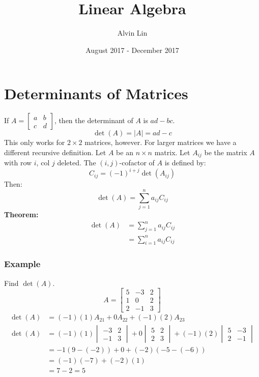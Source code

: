 \documentclass{math}
\title{Linear Algebra}
\author{Alvin Lin}
\date{August 2017 - December 2017}
\begin{document}
\maketitle

\section*{Determinants of Matrices}
If \( A = \begin{bmatrix}a & b \\ c & d\end{bmatrix} \), then the determinant
of \( A \) is \( ad-bc \).
\[ \det(A) = |A| = ad-c \]
This only works for \( 2\times2 \) matrices, however. For larger matrices we
have a different recursive definition. Let \( A \) be an \( n\times n \)
matrix. Let \( A_{ij} \) be the matrix \( A \) with row \( i \), col \( j \)
deleted. The \( (i,j) \)-cofactor of \( A \) is defined by:
\[ C_{ij} = (-1)^{i+j}\det(A_{ij}) \]
Then:
\[ \det(A) = \sum_{j=1}^{n}a_{ij}C_{ij} \]
\textbf{Theorem:}
\begin{align*}
  \det(A) &= \sum_{j=1}^{n}a_{ij}C_{ij} \\
  &= \sum_{i=1}^{n}a_{ij}C_{ij}
\end{align*}

\subsubsection*{Example}
Find \( \det(A) \).
\[ A = \begin{bmatrix}5 & -3 & 2 \\ 1 & 0 & 2 \\ 2 & -1 & 3\end{bmatrix} \]
\begin{align*}
  \det(A) &= (-1)(1)A_{21}+0A_{22}+(-1)(2)A_{23} \\
  \det(A) &= (-1)(1)\begin{vmatrix}-3 & 2 \\ -1 & 3\end{vmatrix}+
    0\begin{vmatrix}5 & 2 \\ 2 & 3\end{vmatrix}+
    (-1)(2)\begin{vmatrix}5 & -3 \\ 2 & -1\end{vmatrix} \\
  &= -1(9-(-2))+0+(-2)(-5-(-6)) \\
  &= (-1)(-7)+(-2)(1) \\
  &= 7-2 = 5
\end{align*}
\end{document}
